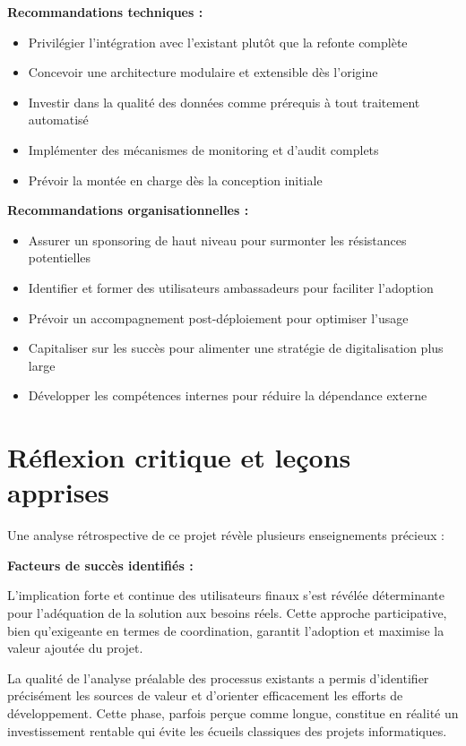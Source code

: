 \textbf{Recommandations techniques :}

\begin{itemize}
    \item Privilégier l'intégration avec l'existant plutôt que la refonte complète
    \item Concevoir une architecture modulaire et extensible dès l'origine
    \item Investir dans la qualité des données comme prérequis à tout traitement automatisé
    \item Implémenter des mécanismes de monitoring et d'audit complets
    \item Prévoir la montée en charge dès la conception initiale
\end{itemize}

\textbf{Recommandations organisationnelles :}

\begin{itemize}
    \item Assurer un sponsoring de haut niveau pour surmonter les résistances potentielles
    \item Identifier et former des utilisateurs ambassadeurs pour faciliter l'adoption
    \item Prévoir un accompagnement post-déploiement pour optimiser l'usage
    \item Capitaliser sur les succès pour alimenter une stratégie de digitalisation plus large
    \item Développer les compétences internes pour réduire la dépendance externe
\end{itemize}

\section*{Réflexion critique et leçons apprises}

Une analyse rétrospective de ce projet révèle plusieurs enseignements précieux :

\medskip

\textbf{Facteurs de succès identifiés :}

L'implication forte et continue des utilisateurs finaux s'est révélée déterminante pour l'adéquation de la solution aux besoins réels. Cette approche participative, bien qu'exigeante en termes de coordination, garantit l'adoption et maximise la valeur ajoutée du projet.

\medskip

La qualité de l'analyse préalable des processus existants a permis d'identifier précisément les sources de valeur et d'orienter efficacement les efforts de développement. Cette phase, parfois perçue comme longue, constitue en réalité un investissement rentable qui évite les écueils classiques des projets informatiques.

